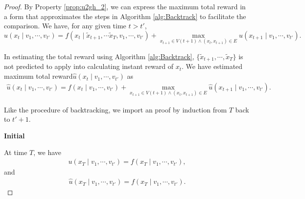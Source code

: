 \documentclass[12pt]{article}
\begin{document}
\begin{lem}
\begin{proof}
By Property \ref{prop:u2gh_2}, we can express the maximum total reward in a form that approximates the steps in Algorithm \ref{alg:Backtrack} to facilitate the comparison.
We have, for any given time $ t > t' $,
\begin{equation}
\label{eq:def_g_2}
u( x_{t} \mid v_{1} , \cdots , v_{t'} ) = f( x_{t} \mid \tilde{x}_{t+1}, \cdots \tilde{x}_{T}, v_{1} , \cdots , v_{t'} ) +  \max_{x_{t+1} \in V(t+1) \land ( x_{t}, x_{t+1} ) \in E } u( x_{t+1} \mid v_{1} , \cdots , v_{t'} ).
\end{equation}

In estimating the total reward using Algorithm \ref{alg:Backtrack}, $ \{ \tilde{x}_{t+1}, \cdots , \tilde{x}_{T} \} $ is not predicted to apply into calculating instant reward of $ x_{t} $.
We have estimated maximum total reward$ \hat{u}(x_{t} \mid v_{1} , \cdots , v_{t'} ) $ as 
\begin{equation}
\label{eq:defHatG}
\begin{aligned}
\hat{u}( x_{t} \mid v_{1} , \cdots , v_{t'} ) = f( x_{t} \mid v_{1} , \cdots , v_{t'} ) + \max_{ x_{t+1} \in V(t+1) \land ( x_{t}, x_{t+1} ) \in E } \hat{u}( x_{t+1} \mid v_{1} , \cdots , v_{t'} ).
\end{aligned}
\end{equation}

Like the procedure of backtracking, we import an proof by induction from $ T $ back to $ t' + 1 $.

\textbf{Initial}

At time $ T $, we have
\begin{equation}
\label{eq:eqT1}
\begin{aligned}
u( x_{T} \mid  v_{1} , \cdots , v_{t'} ) = f( x_{T} \mid v_{1} , \cdots , v_{t'} ),
\end{aligned}
\end{equation}
and
\begin{equation}
\label{eq:eqT2}
\begin{aligned}
\hat{u}( x_{T} \mid v_{1} , \cdots , v_{t'} ) = f( x_{T} \mid v_{1} , \cdots , v_{t'} ).
\end{aligned}
\end{equation}


\end{proof}
\end{lem}
\end{document}

